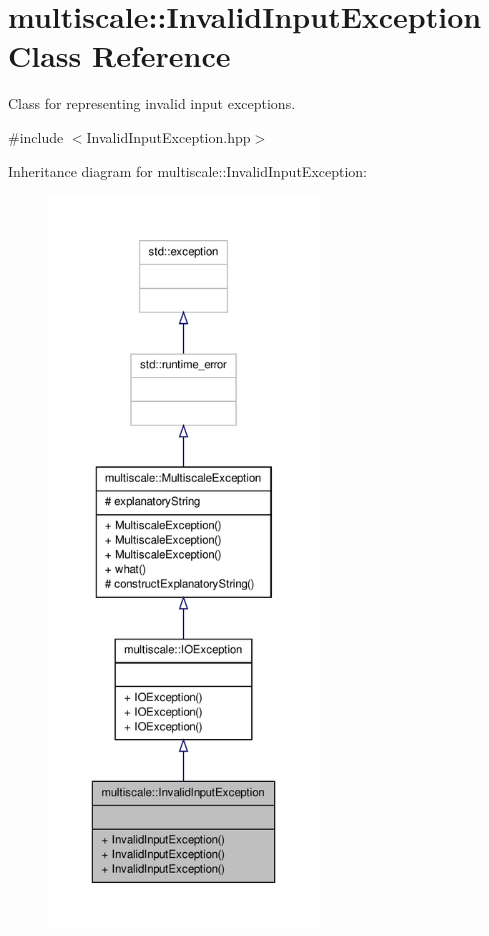 \hypertarget{classmultiscale_1_1InvalidInputException}{\section{multiscale\-:\-:\-Invalid\-Input\-Exception \-Class \-Reference}
\label{classmultiscale_1_1InvalidInputException}
}


\-Class for representing invalid input exceptions.  




{\ttfamily \#include $<$\-Invalid\-Input\-Exception.\-hpp$>$}



\-Inheritance diagram for multiscale\-:\-:\-Invalid\-Input\-Exception\-:
\nopagebreak
\begin{figure}[H]
\begin{center}
\leavevmode
\includegraphics[height=550pt]{classmultiscale_1_1InvalidInputException__inherit__graph}
\end{center}
\end{figure}


